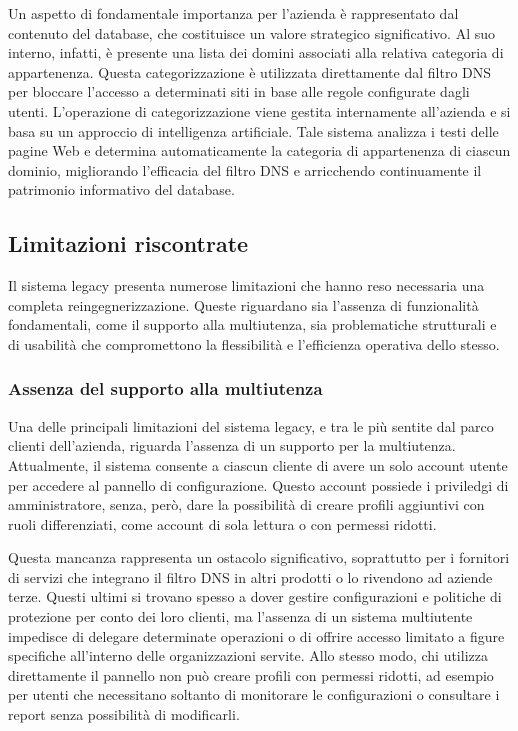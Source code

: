 Un aspetto di fondamentale importanza per l'azienda è rappresentato dal contenuto del database, che costituisce un valore strategico significativo. Al suo interno, infatti, è presente una lista dei domini associati alla relativa categoria di appartenenza. Questa categorizzazione è utilizzata direttamente dal filtro DNS per bloccare l'accesso a determinati siti in base alle regole configurate dagli utenti. L'operazione di categorizzazione viene gestita internamente all'azienda e si basa su un approccio di intelligenza artificiale. Tale sistema analizza i testi delle pagine Web e determina automaticamente la categoria di appartenenza di ciascun dominio, migliorando l'efficacia del filtro DNS e arricchendo continuamente il patrimonio informativo del database.

\subsection{Limitazioni riscontrate}
Il sistema legacy presenta numerose limitazioni che hanno reso necessaria una completa reingegnerizzazione. Queste riguardano sia l’assenza di funzionalità fondamentali, come il supporto alla multiutenza, sia problematiche strutturali e di usabilità che compromettono la flessibilità e l’efficienza operativa dello stesso.

\subsubsection{Assenza del supporto alla multiutenza}
Una delle principali limitazioni del sistema legacy, e tra le più sentite dal parco clienti dell'azienda, riguarda l'assenza di un supporto per la multiutenza. Attualmente, il sistema consente a ciascun cliente di avere un solo account utente per accedere al pannello di configurazione. Questo account possiede i priviledgi di amministratore, senza, però, dare la possibilità di creare profili aggiuntivi con ruoli differenziati, come account di sola lettura o con permessi ridotti.

Questa mancanza rappresenta un ostacolo significativo, soprattutto per i fornitori di servizi che integrano il filtro DNS in altri prodotti o lo rivendono ad aziende terze. Questi ultimi si trovano spesso a dover gestire configurazioni e politiche di protezione per conto dei loro clienti, ma l'assenza di un sistema multiutente impedisce di delegare determinate operazioni o di offrire accesso limitato a figure specifiche all’interno delle organizzazioni servite. Allo stesso modo, chi utilizza direttamente il pannello non può creare profili con permessi ridotti, ad esempio per utenti che necessitano soltanto di monitorare le configurazioni o consultare i report senza possibilità di modificarli.

